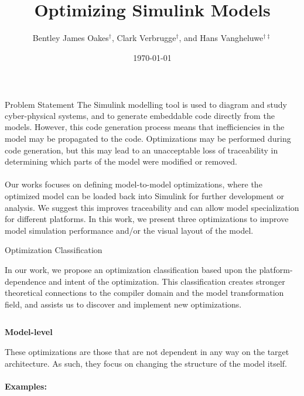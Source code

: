 \documentclass[final,hyperref={pdfpagelabels=false}]{beamer}
\title{Optimizing Simulink\textsuperscript{\textregistered} Models}
\author{Bentley James Oakes$^{\dagger}$, Clark Verbrugge$^{\dagger}$, and Hans Vangheluwe$^{\dagger\ddagger}$}
\institute[McGill University]{$^{\dagger}$McGill University, Montreal,
      Canada\qquad $^{\ddagger}$University of Antwerp, Belgium}
\date{\today}
\begin{document}
  \begin{frame}{}
      
        \begin{block}{\large Problem Statement}
        \small
   		The Simulink\textsuperscript{\textregistered} modelling tool is used to diagram and study cyber-physical systems, and to generate embeddable code directly from the models.
   		However, this code generation process means that inefficiencies in the model may be propagated to the code. Optimizations may be performed during code
   		generation, but this may lead to an unacceptable loss of traceability in determining
   		which parts of the model were modified or removed.\\~\\
   	    Our works focuses on defining model-to-model optimizations, where the optimized
   		model can be loaded back into Simulink for further development or analysis. We suggest this improves traceability and
   		can allow model specialization for different platforms. In this work, we present three optimizations to improve model simulation performance and/or the visual layout of the model.
        \end{block}
        

    \begin{block}{Optimization Classification}
    \begin{center}
    \small
    In our work, we propose an optimization classification based upon the platform-dependence and intent of the optimization. This classification creates
    stronger theoretical connections to the compiler domain and the model
    transformation field, and assists us to discover and implement new optimizations.
    \end{center}
    \vspace{-1.5cm}
            \begin{columns}[t,totalwidth=\linewidth]
             \begin{column}{.19\linewidth}
             \small
           \begin{center}\textbf{Model-level}\end{center}
           \footnotesize
           These optimizations are those that are not dependent in any way on the target architecture. As such, they focus on changing the structure of the model itself. \\~\\
           
           \textbf{Examples:}
           

\end{column}
\end{columns}
\end{block}
\end{frame}
\end{document}
